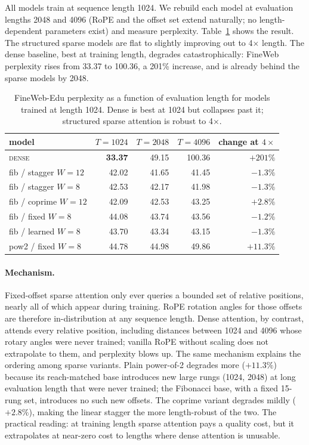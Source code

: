 \documentclass[11pt]{article}
\begin{document}
All models train at sequence length 1024. We rebuild each model at evaluation
lengths 2048 and 4096 (RoPE and the offset set extend naturally; no
length-dependent parameters exist) and measure perplexity.
Table~\ref{tab:extrap} shows the result. The structured sparse models are flat to
slightly improving out to 4$\times$ length. The dense baseline, best at training
length, degrades catastrophically: FineWeb perplexity rises from 33.37 to 100.36,
a 201\% increase, and is already behind the sparse models by 2048.

\begin{table}[htbp]
\centering
\small
\begin{tabular}{lrrrr}
\toprule
model & $T{=}1024$ & $T{=}2048$ & $T{=}4096$ & change at $4\times$ \\
\midrule
\textsc{dense}        & \textbf{33.37} & 49.15 & 100.36 & $+201\%$ \\
fib / stagger $W{=}12$ & 42.02 & 41.65 & 41.45 & $-1.3\%$ \\
fib / stagger $W{=}8$  & 42.53 & 42.17 & 41.98 & $-1.3\%$ \\
fib / coprime $W{=}12$ & 42.09 & 42.53 & 43.25 & $+2.8\%$ \\
fib / fixed $W{=}8$    & 44.08 & 43.74 & 43.56 & $-1.2\%$ \\
fib / learned $W{=}8$  & 43.70 & 43.34 & 43.15 & $-1.3\%$ \\
pow2 / fixed $W{=}8$   & 44.78 & 44.98 & 49.86 & $+11.3\%$ \\
\bottomrule
\end{tabular}
\caption{FineWeb-Edu perplexity as a function of evaluation length for
models trained at length 1024. Dense is best at 1024 but collapses past it;
structured sparse attention is robust to 4$\times$.}
\label{tab:extrap}
\end{table}

\paragraph{Mechanism.}
Fixed-offset sparse attention only ever queries a bounded set of relative
positions, nearly all of which appear during training. RoPE rotation angles for
those offsets are therefore in-distribution at any sequence length. Dense
attention, by contrast, attends every relative position, including distances
between 1024 and 4096 whose rotary angles were never trained; vanilla RoPE
without scaling does not extrapolate to them, and perplexity blows up. The same
mechanism explains the ordering among sparse variants. Plain power-of-2 degrades
more ($+11.3\%$) because its reach-matched base introduces new large rungs (1024,
2048) at long evaluation length that were never trained; the Fibonacci base, with
a fixed 15-rung set, introduces no such new offsets. The coprime variant degrades
mildly ($+2.8\%$), making the linear stagger the more length-robust of the two.
The practical reading: at training length sparse attention pays a quality cost,
but it extrapolates at near-zero cost to lengths where dense attention is
unusable.
\end{document}
